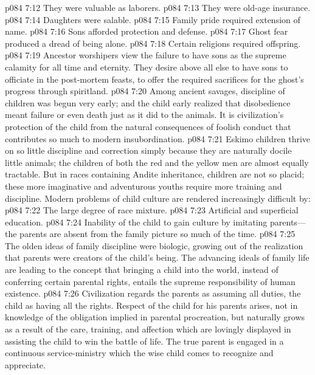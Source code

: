 \pc \vs p084 7:12 \bibnobreakspace They were valuable as laborers.
\vs p084 7:13 \bibnobreakspace They were old\hyp{}age insurance.
\vs p084 7:14 \bibnobreakspace Daughters were salable.
\vs p084 7:15 \bibnobreakspace Family pride required extension of name.
\vs p084 7:16 \bibnobreakspace Sons afforded protection and defense.
\vs p084 7:17 \bibnobreakspace Ghost fear produced a dread of being alone.
\vs p084 7:18 \bibnobreakspace Certain religions required offspring.
\pc \vs p084 7:19 Ancestor worshipers view the failure to have sons as the supreme calamity for all time and eternity. They desire above all else to have sons to officiate in the post\hyp{}mortem feasts, to offer the required sacrifices for the ghost’s progress through spiritland.
\vs p084 7:20 Among ancient savages, discipline of children was begun very early; and the child early realized that disobedience meant failure or even death just as it did to the animals. It is civilization’s protection of the child from the natural consequences of foolish conduct that contributes so much to modern insubordination.
\vs p084 7:21 Eskimo children thrive on so little discipline and correction simply because they are naturally docile little animals; the children of both the red and the yellow men are almost equally tractable. But in races containing Andite inheritance, children are not so placid; these more imaginative and adventurous youths require more training and discipline. Modern problems of child culture are rendered increasingly difficult by:
\pc \vs p084 7:22 \bibnobreakspace The large degree of race mixture.
\vs p084 7:23 \bibnobreakspace Artificial and superficial education.
\vs p084 7:24 \bibnobreakspace Inability of the child to gain culture by imitating parents---the parents are absent from the family picture so much of the time.
\pc \vs p084 7:25 The olden ideas of family discipline were biologic, growing out of the realization that parents were creators of the child’s being. The advancing ideals of family life are leading to the concept that bringing a child into the world, instead of conferring certain parental rights, entails the supreme responsibility of human existence.
\vs p084 7:26 Civilization regards the parents as assuming all duties, the child as having all the rights. Respect of the child for his parents arises, not in knowledge of the obligation implied in parental procreation, but naturally grows as a result of the care, training, and affection which are lovingly displayed in assisting the child to win the battle of life. The true parent is engaged in a continuous service\hyp{}ministry which the wise child comes to recognize and appreciate.
